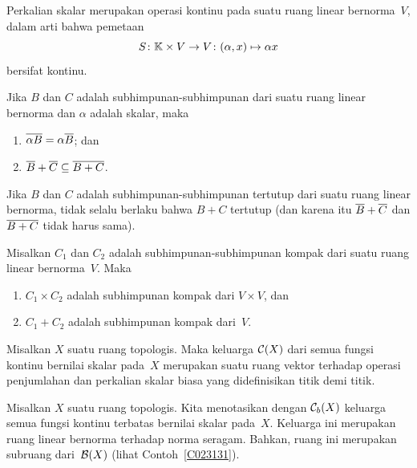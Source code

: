 \begin{prop}\label{C023434} Perkalian skalar merupakan operasi kontinu pada suatu ruang
linear bernorma~$V$, dalam arti bahwa pemetaan
   \[ S \colon \mathbb{K} \times V \rightarrow V \colon  (\alpha,x) \mapsto \alpha x \]
bersifat kontinu.
\end{prop}

\begin{prop} Jika $B$ dan $C$ adalah subhimpunan-subhimpunan dari suatu ruang linear bernorma dan $\alpha$ adalah skalar, maka
 \begin{enumerate}
   \item $\overline{\alpha B} = \alpha \overline{B}$; dan
   \item $\overline{B} + \overline{C}  \subseteq  \overline{B + C}$.
 \end{enumerate}
\end{prop}

\begin{exam} Jika $B$ dan $C$ adalah subhimpunan-subhimpunan tertutup dari suatu ruang linear bernorma, tidak
selalu berlaku bahwa $B + C$ tertutup (dan karena itu $\overline{B} + \overline{C}$ dan $\overline{B +
C}$ tidak harus sama).
\end{exam}

\begin{prop} Misalkan $C_1$ dan $C_2$ adalah subhimpunan-subhimpunan kompak dari suatu ruang linear bernorma~$V$. Maka
   \begin{enumerate}
     \item $C_1 \times C_2$ adalah subhimpunan kompak dari $V \times V$, dan
     \item $C_1 + C_2$ adalah subhimpunan kompak dari~$V$.
   \end{enumerate}
\end{prop}

\begin{exam}\label{C023441} Misalkan $X$ suatu ruang topologis. Maka keluarga
$\mathcal{C}(X)$ dari semua fungsi kontinu bernilai skalar pada~$X$ merupakan suatu
ruang vektor terhadap operasi penjumlahan dan perkalian skalar biasa yang didefinisikan titik demi titik.
\end{exam}

\begin{exam}\label{C023443} Misalkan $X$ suatu ruang topologis. Kita menotasikan
dengan $\mathcal{C}_b(X)$ keluarga semua fungsi kontinu terbatas bernilai skalar pada~$X$. Keluarga ini merupakan
ruang linear bernorma terhadap norma seragam. Bahkan, ruang ini merupakan subruang dari~$\mathcal{B}(X)$
(lihat Contoh~\ref{C023131}).
\end{exam}

